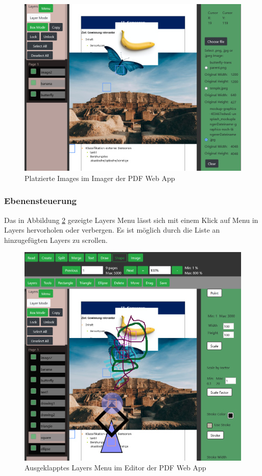 \begin{figure}[!htbp]
	\centering
	\includegraphics[width=1\textwidth]{"images/imaging.png"}
	\caption{Platzierte Images im Imager der PDF Web App}
	\label{fig:imaging}
\end{figure}

\subsubsection{Ebenensteuerung}
Das in Abbildung \ref{fig:ebenenmenu} gezeigte Layers Menu lässt sich mit einem Klick auf Menu in Layers hervorholen oder verbergen. Es ist möglich durch die Liste an hinzugefügten Layers zu scrollen.

\begin{figure}[!htbp]
	\centering
	\includegraphics[width=1\textwidth]{"images/ebenenmenu.png"}
	\caption{Ausgeklapptes Layers Menu im Editor der PDF Web App}
	\label{fig:ebenenmenu}
\end{figure}

